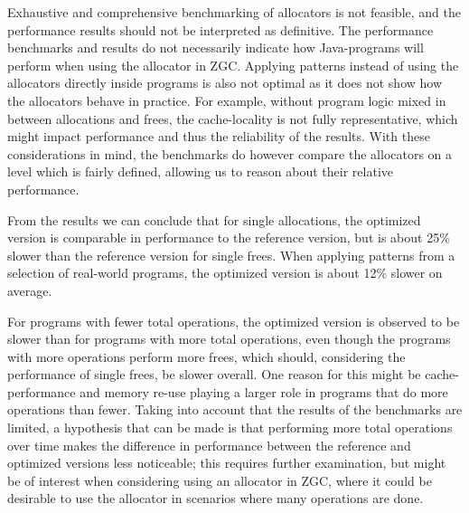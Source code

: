 


Exhaustive and comprehensive benchmarking of allocators is not feasible, and the performance results should not be interpreted as definitive. The performance benchmarks and results do not necessarily indicate how Java-programs will perform when using the allocator in ZGC. Applying patterns instead of using the allocators directly inside programs is also not optimal as it does not show how the allocators behave in practice. For example, without program logic mixed in between allocations and frees, the cache-locality is not fully representative, which might impact performance and thus the reliability of the results. With these considerations in mind, the benchmarks do however compare the allocators on a level which is fairly defined, allowing us to reason about their relative performance. 

From the results we can conclude that for single allocations, the optimized version is comparable in performance to the reference version, but is about 25\% slower than the reference version for single frees. When applying patterns from a selection of real-world programs, the optimized version is about 12\% slower on average. 

For programs with fewer total operations, the optimized version is observed to be slower than for programs with more total operations, even though the programs with more operations perform more frees, which should, considering the performance of single frees, be slower overall. One reason for this might be cache-performance and memory re-use playing a larger role in programs that do more operations than fewer. Taking into account that the results of the benchmarks are limited, a hypothesis that can be made is that performing more total operations over time makes the difference in performance between the reference and optimized versions less noticeable; this requires further examination, but might be of interest when considering using an allocator in ZGC, where it could be desirable to use the allocator in scenarios where many operations are done.

